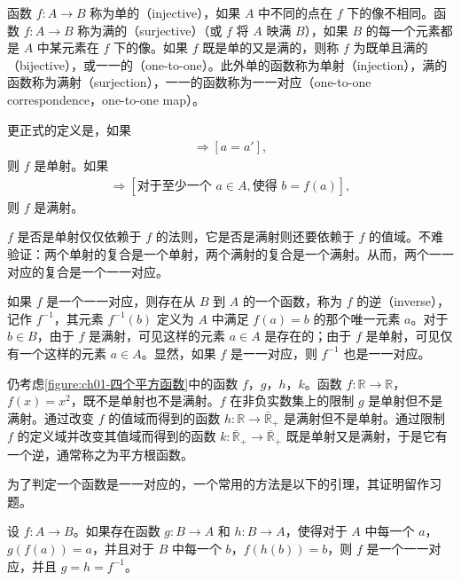 \documentclass[../../main.tex]{subfiles}
\begin{document}
\begin{definition}[单射、满射、双射]\label{definition:ch01-单满双射}
函数 $f: A \longrightarrow B$ 称为单的（injective），如果 $A$ 中不同的点在 $f$ 下的像不相同。函数 $f: A \longrightarrow B$ 称为满的（surjective）（或 $f$ 将 $A$ 映满 $B$），如果 $B$ 的每一个元素都是 $A$ 中某元素在 $f$ 下的像。如果 $f$ 既是单的又是满的，则称 $f$ 为既单且满的（bijective），或一一的（one-to-one）。此外单的函数称为单射（injection），满的函数称为满射（surjection），一一的函数称为一一对应（one-to-one correspondence，one-to-one map）。
\end{definition}

更正式的定义是，如果
\begin{align*}
[f(a) = f(a')] \Longrightarrow [a = a'],
\end{align*}
则 $f$ 是单射。如果
\begin{align*}
[b \in B] \Longrightarrow [\text{对于至少一个 } a \in A, \text{使得 } b = f(a)],
\end{align*}
则 $f$ 是满射。

$f$ 是否是单射仅仅依赖于 $f$ 的法则，它是否是满射则还要依赖于 $f$ 的值域。不难验证：两个单射的复合是一个单射，两个满射的复合是一个满射。从而，两个一一对应的复合是一个一一对应。

如果 $f$ 是一个一一对应，则存在从 $B$ 到 $A$ 的一个函数，称为 $f$ 的逆（inverse），记作 $f^{-1}$，其元素 $f^{-1}(b)$ 定义为 $A$ 中满足 $f(a) = b$ 的那个唯一元素 $a$。对于 $b \in B$，由于 $f$ 是满射，可见这样的元素 $a \in A$ 是存在的；由于 $f$ 是单射，可见仅有一个这样的元素 $a \in A$。显然，如果 $f$ 是一一对应，则 $f^{-1}$ 也是一一对应。

\begin{example}\label{example:ch01-单满双射例}
仍考虑\cref{figure:ch01-四个平方函数}中的函数 $f$，$g$，$h$，$k$。函数 $f: \mathbb{R} \longrightarrow \mathbb{R}$，$f(x) = x^{2}$，既不是单射也不是满射。$f$ 在非负实数集上的限制 $g$ 是单射但不是满射。通过改变 $f$ 的值域而得到的函数 $h: \mathbb{R} \longrightarrow \bar{\mathbb{R}}_{+}$ 是满射但不是单射。通过限制 $f$ 的定义域并改变其值域而得到的函数 $k: \bar{\mathbb{R}}_{+} \longrightarrow \bar{\mathbb{R}}_{+}$ 既是单射又是满射，于是它有一个逆，通常称之为平方根函数。
\end{example}

为了判定一个函数是一一对应的，一个常用的方法是以下的引理，其证明留作习题。

\begin{lemma}[逆的存在性]\label{lemma:ch01-逆存在}
设 $f: A \longrightarrow B$。如果存在函数 $g: B \longrightarrow A$ 和 $h: B \longrightarrow A$，使得对于 $A$ 中每一个 $a$，$g(f(a)) = a$，并且对于 $B$ 中每一个 $b$，$f(h(b)) = b$，则 $f$ 是一个一一对应，并且 $g = h = f^{-1}$。
\end{lemma}
\end{document}
